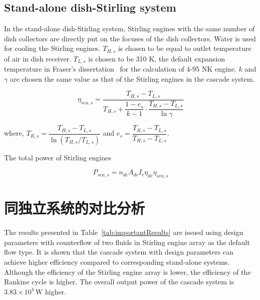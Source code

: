 \subsection{Stand-alone dish-Stirling system}

In the stand-alone dish-Stirling system, Stirling engines with the same number of dish collectors are directly put on the focuses of the dish collectors. Water is used for cooling the Stirling engines. $T_{H,s}$ is chosen to be equal to outlet temperature of air in dish receiver. $T_{L,s}$ is chosen to be 310 K, the default expansion temperature in Fraser's dissertation~\cite{Fraser2008} for the calculation of 4-95 NK\uppercase\expandafter{} engine. $k$ and $\gamma$ are chosen the same value as that of the Stirling engines in the cascade system.

\begin{equation}
	\eta_{sea,s}=\dfrac{T_{H,s}-T_{L,s}}{T_{H,s}+\dfrac{1-e_{s}}{k-1}\cdot\dfrac{T_{H,s}-T_{L,s}}{\ln\gamma}}
\end{equation}

where, $T_{R,s}=\dfrac{T_{H,s}-T_{L,s}}{\ln(T_{H,s}/T_{L,s})}$ and $e_{s}=\dfrac{T_{R,s}-T_{L,s}}{T_{H,s}-T_{L,s}}$.

The total power of Stirling engines

\begin{equation}
	P_{sea,s}=n_{dc}A_{dc}I_r\eta_{dc}\eta_{sea,s}
\end{equation}

\section{同独立系统的对比分析}
The results presented in Table~\ref{tab:importantResults} are issued using design parameters with counterflow of two fluids in Stirling engine array as the default flow type. It is shown that the cascade system with design parameters can achieve higher efficiency compared to corresponding stand-alone systems. Although the efficiency of the Stirling engine array is lower, the efficiency of the Rankine cycle is higher. The overall output power of the cascade system is $3.83\times10^4\,\mathrm{W}$ higher.

